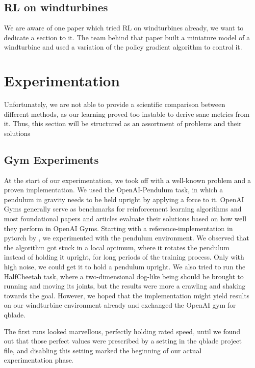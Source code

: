 \documentclass[hyperref,german,beleg]{cgvpub}
\begin{document}
\section{RL on windturbines}
We are aware of one paper \cite{kolterDesignAnalysisLearning2012} which tried RL on windturbines already, we want to dedicate a section to it. The team behind that paper built a miniature model of a windturbine and used a variation of the policy gradient algorithm to control it.

\chapter{Experimentation}

Unfortunately, we are not able to provide a scientific comparison between different methods, as our learning proved too instable to derive sane metrics from it. Thus, this section will be structured as an assortment of problems and their solutions

\section{Gym Experiments}

At the start of our experimentation, we took off with a well-known problem and a proven implementation. We used the OpenAI-Pendulum task, in which a pendulum in gravity needs to be held upright by applying a force to it. OpenAI Gyms generally serve as benchmarks for reinforcement learning algorithms and most foundational papers and articles evaluate their solutions based on how well they perform in OpenAI Gyms. Starting with a reference-implementation in pytorch by \cite{DeepDeterministicPolicy}, we experimented with the pendulum environment. We observed that the algorithm got stuck in a local optimum, where it rotates the pendulum instead of holding it upright, for long periods of the training process. Only with high noise, we could get it to hold a pendulum upright. We also tried to run the HalfCheetah task, where a two-dimensional dog-like being should be brought to running and moving its joints, but the results were more a crawling and shaking towards the goal. However, we hoped that the implementation might yield results on our windturbine environment already and exchanged the OpenAI gym for qblade.

The first runs looked marvellous, perfectly holding rated speed, until we found out that those perfect values were prescribed by a setting in the qblade project file, and disabling this setting marked the beginning of our actual experimentation phase.
\end{document}

